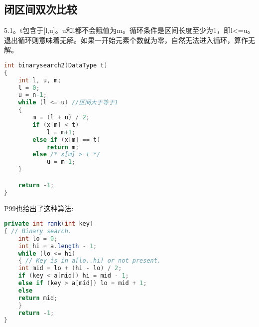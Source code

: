 \subsection{闭区间双次比较}
\cite{pp}5.1。t包含于[l,u]。u和l都不会赋值为m。循环条件是区间长度至少为1，即l<=u。退出循环则意味着无解。如果一开始元素个数就为零，自然无法进入循环，算作无解。
\begin{lstlisting}[language=C]
int binarysearch2(DataType t)
{	
	int l, u, m;
	l = 0;
	u = n-1;
	while (l <= u) //区间大于等于1 
	{
		m = (l + u) / 2;
		if (x[m] < t)
			l = m+1;
		else if (x[m] == t)
			return m;
		else /* x[m] > t */
			u = m-1;
	}

	return -1;
}


\end{lstlisting}

\cite{sedgewick}P99也给出了这种算法:

\begin{lstlisting}[language=Java]
private int rank(int key)
{ // Binary search.
    int lo = 0;
    int hi = a.length - 1;
    while (lo <= hi)
    { // Key is in a[lo..hi] or not present.
	int mid = lo + (hi - lo) / 2;
	if (key < a[mid]) hi = mid - 1;
	else if (key > a[mid]) lo = mid + 1;
	else
	return mid;
    }
    return -1;
}

\end{lstlisting}










